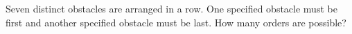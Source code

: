 Seven distinct obstacles are arranged in a row. One specified obstacle must be first and another specified obstacle must be last. How many orders are possible?
